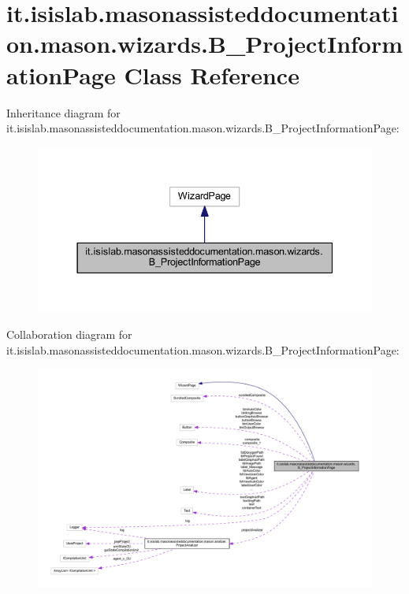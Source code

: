 \hypertarget{classit_1_1isislab_1_1masonassisteddocumentation_1_1mason_1_1wizards_1_1_b___project_information_page}{\section{it.\-isislab.\-masonassisteddocumentation.\-mason.\-wizards.\-B\-\_\-\-Project\-Information\-Page Class Reference}
\label{classit_1_1isislab_1_1masonassisteddocumentation_1_1mason_1_1wizards_1_1_b___project_information_page}
}


Inheritance diagram for it.\-isislab.\-masonassisteddocumentation.\-mason.\-wizards.\-B\-\_\-\-Project\-Information\-Page\-:
\nopagebreak
\begin{figure}[H]
\begin{center}
\leavevmode
\includegraphics[width=337pt]{classit_1_1isislab_1_1masonassisteddocumentation_1_1mason_1_1wizards_1_1_b___project_information_page__inherit__graph}
\end{center}
\end{figure}


Collaboration diagram for it.\-isislab.\-masonassisteddocumentation.\-mason.\-wizards.\-B\-\_\-\-Project\-Information\-Page\-:
\nopagebreak
\begin{figure}[H]
\begin{center}
\leavevmode
\includegraphics[width=350pt]{classit_1_1isislab_1_1masonassisteddocumentation_1_1mason_1_1wizards_1_1_b___project_information_page__coll__graph}
\end{center}
\end{figure}
